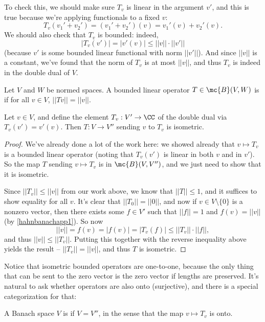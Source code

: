 To check this, we should make sure $T_v$ is linear in the argument $v'$, and this is true because we're applying functionals to a fixed $v$: 
\[
    T_{v}(v_1' + v_2') = (v_1' + v_2')(v) = v_1'(v) + v_2'(v).
\]
We should also check that $T_v$ is bounded: indeed, 
\[
    |T_v(v')| = |v'(v)| \le ||v|| \cdot ||v'||
\]
(because $v'$ is some bounded linear functional with norm $||v'||$). And since $||v||$ is a constant, we've found that the norm of $T_v$ is at most $||v||$, and thus $T_v$ is indeed in the double dual of $V$. 

\begin{definition}
Let $V$ and $W$ be normed spaces. A bounded linear operator $T \in \mc{B}(V, W)$ is  if for all $v \in V$, $||Tv|| = ||v||$.
\end{definition}

\begin{theorem}
Let $v \in V$, and define the element $T_v: V' \to \CC$ of the double dual via $T_v(v') = v'(v)$. Then $T: V \to V''$ sending $v$ to $T_v$ is isometric.
\end{theorem}
\begin{proof}
We've already done a lot of the work here: we showed already that $v \mapsto T_v$ is a bounded linear operator (noting that $T_v(v')$ is linear in both $v$ and in $v'$). So the map $T$ sending $v \mapsto T_v$ is in $\mc{B}(V, V'')$, and we just need to show that it is isometric. 

Since $\boxed{||T_v|| \le ||v||}$ from our work above, we know that $||T|| \le 1$, and it suffices to show equality for all $v$. It's clear that $||T_0|| = ||0||$, and now if $v \in V \setminus \{0\}$ is a nonzero vector, then there exists some $f \in V'$ such that $||f|| = 1$ and $f(v) = ||v||$ (by \cref{hahnbanachapp1}). So now 
\[
    ||v|| = f(v) = |f(v)| = |T_v(f)| \le ||T_v|| \cdot ||f||,
\]
and thus $\boxed{||v|| \le ||T_v||}$. Putting this together with the reverse inequality above yields the result -- $||T_v|| = ||v||$, and thus $T$ is isometric.
\end{proof}

Notice that isometric bounded operators are one-to-one, because the only thing that can be sent to the zero vector is the zero vector if lengths are preserved. It's natural to ask whether operators are also onto (surjective), and there is a special categorization for that:

\begin{definition}
A Banach space $V$ is  if $V = V''$, in the sense that the map $v \mapsto T_v$ is onto.
\end{definition}

